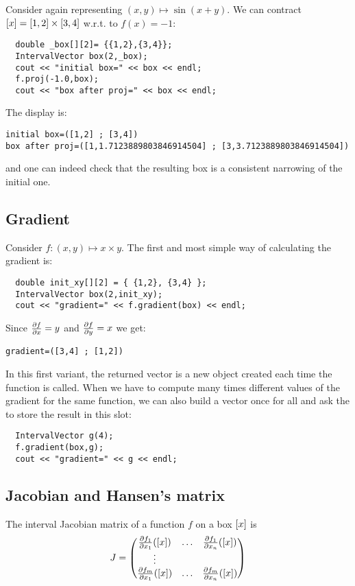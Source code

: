 Consider again  representing $(x,y)\mapsto\sin(x+y)$.
We can contract $[x]=[1,2]\times[3,4]$ w.r.t.
to $f(x)=-1$:

\begin{lstlisting}
  double _box[][2]= {{1,2},{3,4}};
  IntervalVector box(2,_box);
  cout << "initial box=" << box << endl;
  f.proj(-1.0,box);
  cout << "box after proj=" << box << endl;
\end{lstlisting}
The display is:
\begin{verbatim}
initial box=([1,2] ; [3,4])
box after proj=([1,1.7123889803846914504] ; [3,3.7123889803846914504])
\end{verbatim}
and one can indeed check that the resulting box is a consistent narrowing
of the initial one.

\subsection{Gradient}

Consider $f:(x,y)\mapsto x\times y$.
The first and most simple way of calculating the gradient is:
\begin{lstlisting}
  double init_xy[][2] = { {1,2}, {3,4} };
  IntervalVector box(2,init_xy);
  cout << "gradient=" << f.gradient(box) << endl;
\end{lstlisting}

Since $\frac{\partial f}{\partial x}=y$ and $\frac{\partial f}{\partial y}=x$ we get:
\begin{verbatim}
gradient=([3,4] ; [1,2])
\end{verbatim}

In this first variant, the returned vector is a new object created each time the function is called.
When we have to compute many times different values of the gradient for the same function, we can
also build a vector once for all and ask the  to store the result in this slot:

\begin{lstlisting}
  IntervalVector g(4);
  f.gradient(box,g);
  cout << "gradient=" << g << endl;
\end{lstlisting}

\subsection{Jacobian and Hansen's matrix}

The interval Jacobian matrix of a function $f$ on a box $[x]$ is
$$J=\begin{pmatrix}
\frac{\partial f_1}{\partial x_1}([x]) & \ldots & \frac{\partial f_1}{\partial x_n}([x])\\
\vdots \\
\frac{\partial f_m}{\partial x_1}([x]) & \ldots & \frac{\partial f_m}{\partial x_n}([x])\\
\end{pmatrix}$$

